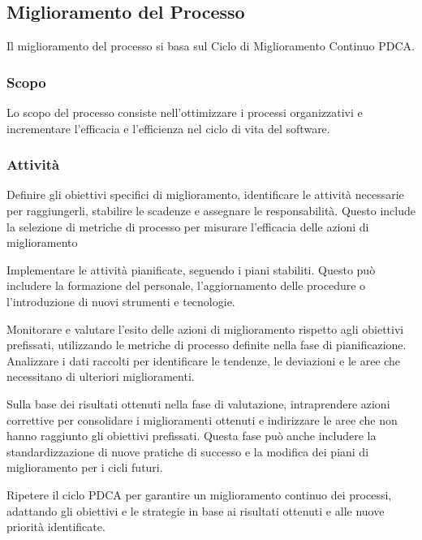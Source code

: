 \subsection{Miglioramento del Processo}

Il miglioramento del processo si basa sul Ciclo di Miglioramento Continuo PDCA.

\subsubsection{Scopo}
Lo scopo del processo consiste nell'ottimizzare i processi organizzativi e
incrementare l'efficacia e l'efficienza nel ciclo di vita del software.

\subsubsection{Attività}
	  Definire gli obiettivi specifici di miglioramento, identificare le
	  attività necessarie per raggiungerli, stabilire le scadenze e
	  assegnare le responsabilità. Questo include la selezione di metriche
	  di processo per misurare l'efficacia delle azioni di miglioramento



	  Implementare le attività pianificate, seguendo i piani stabiliti.
	  Questo può includere la formazione del personale, l'aggiornamento
	  delle procedure o l'introduzione di nuovi strumenti e tecnologie.

	  Monitorare e valutare l'esito delle azioni di miglioramento rispetto
	  agli obiettivi prefissati, utilizzando le metriche di processo
	  definite nella fase di pianificazione. Analizzare i dati raccolti per
	  identificare le tendenze, le deviazioni e le aree che necessitano di
	  ulteriori miglioramenti.

	  Sulla base dei risultati ottenuti nella fase di valutazione,
	  intraprendere azioni correttive per consolidare i miglioramenti
	  ottenuti e indirizzare le aree che non hanno raggiunto gli obiettivi
	  prefissati. Questa fase può anche includere la standardizzazione di
	  nuove pratiche di successo e la modifica dei piani di miglioramento
	  per i cicli futuri.

	  Ripetere il ciclo PDCA per garantire un miglioramento continuo dei
	  processi, adattando gli obiettivi e le strategie in base ai risultati
	  ottenuti e alle nuove priorità identificate.
